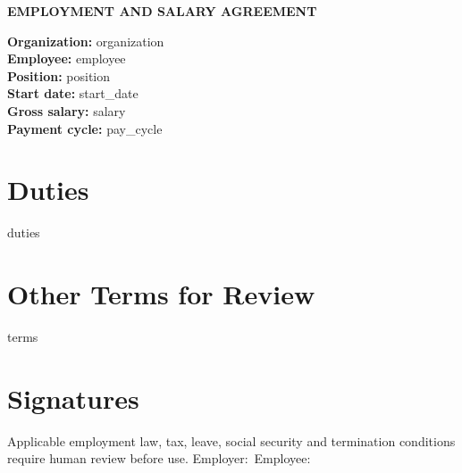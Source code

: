 \documentclass[11pt,a4paper]{article}
\begin{document}
\begin{center}{\Large\bfseries EMPLOYMENT AND SALARY AGREEMENT}\end{center}
\textbf{Organization:} {{organization}}\\
\textbf{Employee:} {{employee}}\\
\textbf{Position:} {{position}}\\
\textbf{Start date:} {{start_date}}\\
\textbf{Gross salary:} {{salary}}\\
\textbf{Payment cycle:} {{pay_cycle}}
\section*{Duties}
{{duties}}
\section*{Other Terms for Review}
{{terms}}
\section*{Signatures}
Applicable employment law, tax, leave, social security and termination
conditions require human review before use.
\vspace{15mm}
Employer:\ \hrulefill \quad Employee:\ \hrulefill
\end{document}
